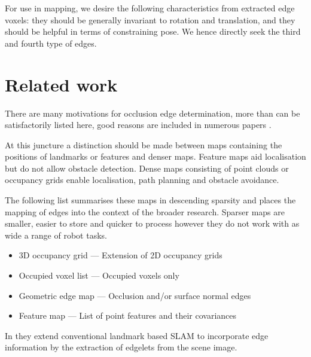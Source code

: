 \documentclass{article} %
\begin{document}
For use in mapping, we desire the following characteristics from extracted edge voxels: they should be generally invariant to rotation and translation, and they should be helpful in terms of constraining pose.   We hence directly seek the third and fourth type of edges.

\section{Related work}

There are many motivations for occlusion edge determination, more than can be satisfactorily listed here, good reasons are included in numerous papers \cite{hoiem2007recovering, bobick1999large, feldman2007motion, feldman2008motion, humayun2011learning}.

At this juncture a distinction should be made between maps containing the positions of landmarks or features and denser maps.  Feature maps aid localisation but do not allow obstacle detection.
Dense maps consisting of point clouds or occupancy grids enable localisation, path planning and obstacle avoidance.

The following list summarises these maps in descending sparsity and places the mapping of edges into the context of the broader research.  Sparser maps are smaller, easier to store and quicker to process however they do not work with as wide a range of robot tasks.
\begin{itemize}
\item 3D occupancy grid --- Extension of 2D occupancy grids
\item Occupied voxel list --- Occupied voxels only
\item Geometric edge map --- Occlusion and/or surface normal edges
\item Feature map --- List of point features and their covariances
\end{itemize}
In \cite{eade2006} they extend conventional landmark based SLAM to incorporate edge information by the extraction of edgelets from the scene image.
\end{document}
